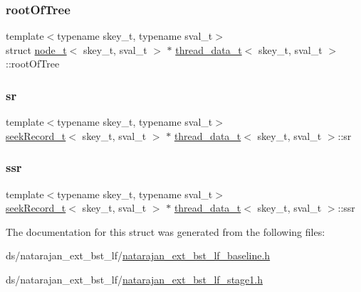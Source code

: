 \mbox{\label{structthread__data__t_a5c58446e4fb376931c8eefd24b907a0b}} 
\subsubsection{\texorpdfstring{root\+Of\+Tree}{rootOfTree}}
{\footnotesize\ttfamily template$<$typename skey\+\_\+t, typename sval\+\_\+t$>$ \\
struct \hyperlink{structnode__t}{node\+\_\+t}$<$ skey\+\_\+t, sval\+\_\+t $>$ $\ast$ \hyperlink{structthread__data__t}{thread\+\_\+data\+\_\+t}$<$ skey\+\_\+t, sval\+\_\+t $>$\+::root\+Of\+Tree}

\mbox{\label{structthread__data__t_a41e98b9f289aa039d8797baf5fcaf886}} 
\subsubsection{\texorpdfstring{sr}{sr}}
{\footnotesize\ttfamily template$<$typename skey\+\_\+t, typename sval\+\_\+t$>$ \\
\hyperlink{structseekRecord__t}{seek\+Record\+\_\+t}$<$ skey\+\_\+t, sval\+\_\+t $>$ $\ast$ \hyperlink{structthread__data__t}{thread\+\_\+data\+\_\+t}$<$ skey\+\_\+t, sval\+\_\+t $>$\+::sr}

\mbox{\label{structthread__data__t_afe71f5c29320086b79b63617b00236a0}} 
\subsubsection{\texorpdfstring{ssr}{ssr}}
{\footnotesize\ttfamily template$<$typename skey\+\_\+t, typename sval\+\_\+t$>$ \\
\hyperlink{structseekRecord__t}{seek\+Record\+\_\+t}$<$ skey\+\_\+t, sval\+\_\+t $>$ $\ast$ \hyperlink{structthread__data__t}{thread\+\_\+data\+\_\+t}$<$ skey\+\_\+t, sval\+\_\+t $>$\+::ssr}



The documentation for this struct was generated from the following files\+:\begin{DoxyCompactItemize}
\item 
ds/natarajan\+\_\+ext\+\_\+bst\+\_\+lf/\hyperlink{natarajan__ext__bst__lf__baseline_8h}{natarajan\+\_\+ext\+\_\+bst\+\_\+lf\+\_\+baseline.\+h}\item 
ds/natarajan\+\_\+ext\+\_\+bst\+\_\+lf/\hyperlink{natarajan__ext__bst__lf__stage1_8h}{natarajan\+\_\+ext\+\_\+bst\+\_\+lf\+\_\+stage1.\+h}\end{DoxyCompactItemize}
